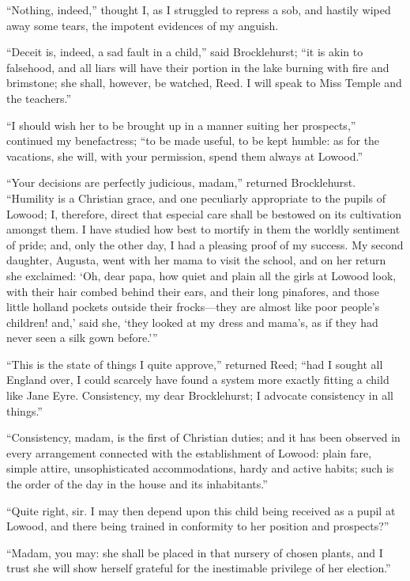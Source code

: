\enquote{Nothing, indeed,} thought I, as I struggled to repress a sob,
and hastily wiped away some tears, the impotent evidences of my anguish.

\enquote{Deceit is, indeed, a sad fault in a child,} said \Mr{}
Brocklehurst; \enquote{it is akin to falsehood, and all liars will have
	their portion in the lake burning with fire and brimstone; she shall,
	however, be watched, \Mrs{} Reed. I will speak to Miss Temple and the
	teachers.}

\enquote{I should wish her to be brought up in a manner suiting her
	prospects,} continued my benefactress; \enquote{to be made useful, to be
	kept humble: as for the vacations, she will, with your permission, spend
	them always at Lowood.}

\enquote{Your decisions are perfectly judicious, madam,} returned \Mr{}
Brocklehurst. \enquote{Humility is a Christian grace, and one
	peculiarly appropriate to the pupils of Lowood; I, therefore, direct
	that especial care shall be bestowed on its cultivation amongst them. I
	have studied how best to mortify in them the worldly sentiment of pride;
	and, only the other day, I had a pleasing proof of my success. My
	second daughter, Augusta, went with her mama to visit the school, and on
	her return she exclaimed: \enquote{Oh, dear papa, how quiet and plain
		all the girls at Lowood look, with their hair combed behind their ears,
		and their long pinafores, and those little holland pockets outside their
		frocks---they are almost like poor people's children! and,} said she,
	\enquote{they looked at my dress and mama's, as if they had never seen
		a silk gown before.}}

\enquote{This is the state of things I quite approve,} returned \Mrs{}
Reed; \enquote{had I sought all England over, I could scarcely have
	found a system more exactly fitting a child like Jane Eyre.
	Consistency, my dear \Mr{} Brocklehurst; I advocate consistency in all
	things.}

\enquote{Consistency, madam, is the first of Christian duties; and it
	has been observed in every arrangement connected with the establishment
	of Lowood: plain fare, simple attire, unsophisticated accommodations,
	hardy and active habits; such is the order of the day in the house and
	its inhabitants.}

\enquote{Quite right, sir. I may then depend upon this child being
	received as a pupil at Lowood, and there being trained in conformity to
	her position and prospects?}

\enquote{Madam, you may: she shall be placed in that nursery of chosen
	plants, and I trust she will show herself grateful for the inestimable
	privilege of her election.}

